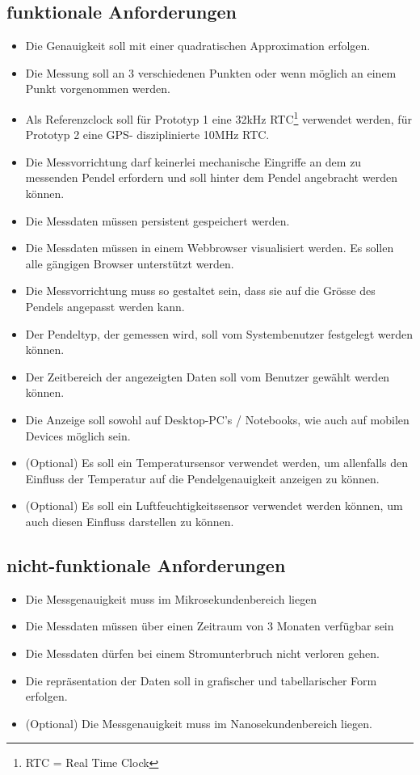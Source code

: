 \subsection{funktionale Anforderungen}
	\begin{itemize}
        \item Die Genauigkeit soll mit einer quadratischen Approximation erfolgen.
        \item Die Messung soll an 3 verschiedenen Punkten oder wenn möglich an einem Punkt vorgenommen werden.
        \item Als Referenzclock soll für Prototyp 1 eine 32kHz RTC\footnote{RTC = Real Time Clock} verwendet werden, für Prototyp 2 eine GPS- disziplinierte 10MHz RTC.
        \item Die Messvorrichtung darf keinerlei mechanische Eingriffe an dem zu messenden Pendel erfordern und soll hinter dem Pendel angebracht werden können.%
        \item Die Messdaten müssen persistent gespeichert werden.
		\item Die Messdaten müssen in einem Webbrowser visualisiert werden. Es sollen alle gängigen Browser unterstützt werden.
		\item Die Messvorrichtung muss so gestaltet sein, dass sie auf die Grösse des Pendels angepasst werden kann.
		\item Der Pendeltyp, der gemessen wird, soll vom Systembenutzer festgelegt werden können.
		\item Der Zeitbereich der angezeigten Daten soll vom Benutzer gewählt werden können.
		\item Die Anzeige soll sowohl auf Desktop-PC's / Notebooks, wie auch auf mobilen Devices möglich sein.
        
		\item (Optional) Es soll ein Temperatursensor verwendet werden, um allenfalls den Einfluss der Temperatur auf die Pendelgenauigkeit anzeigen zu können.
        \item (Optional) Es soll ein Luftfeuchtigkeitssensor verwendet werden können, um auch diesen Einfluss darstellen zu können.
	\end{itemize}
\subsection{nicht-funktionale Anforderungen}
	\begin{itemize}
		\item Die Messgenauigkeit muss im Mikrosekundenbereich liegen
        \item Die Messdaten müssen über einen Zeitraum von 3 Monaten verfügbar sein 
        \item Die Messdaten dürfen bei einem Stromunterbruch nicht verloren gehen.
		\item Die repräsentation der Daten soll in grafischer und tabellarischer Form erfolgen.
        \item (Optional) Die Messgenauigkeit muss im Nanosekundenbereich liegen.
	\end{itemize}


